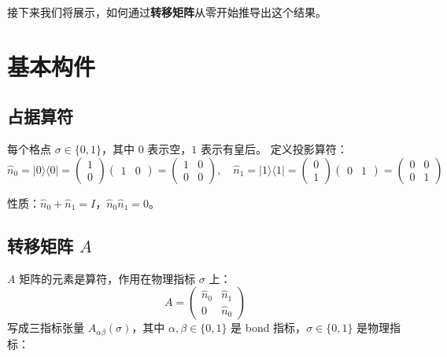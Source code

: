 \documentclass[12pt,a4paper]{article}
\begin{document}
接下来我们将展示，如何通过\textbf{转移矩阵}从零开始推导出这个结果。

\section{基本构件}

\subsection{占据算符}

每个格点 $\sigma \in \{0, 1\}$，其中 $0$ 表示空，$1$ 表示有皇后。
定义投影算符：
\[
\hat{n}_0 = |0\rangle\langle 0| = \begin{pmatrix} 1 \\ 0 \end{pmatrix}\begin{pmatrix} 1 & 0 \end{pmatrix} = \begin{pmatrix} 1 & 0 \\ 0 & 0 \end{pmatrix}, \quad
\hat{n}_1 = |1\rangle\langle 1| = \begin{pmatrix} 0 \\ 1 \end{pmatrix}\begin{pmatrix} 0 & 1 \end{pmatrix} = \begin{pmatrix} 0 & 0 \\ 0 & 1 \end{pmatrix}
\]

性质：$\hat{n}_0 + \hat{n}_1 = I$，$\hat{n}_0 \hat{n}_1 = 0$。

\subsection{转移矩阵 $A$}

\begin{keybox}[核心构件：$A$ 矩阵]
$A$ 矩阵的元素是算符，作用在物理指标 $\sigma$ 上：
\[
A = \begin{pmatrix} \hat{n}_0 & \hat{n}_1 \\ 0 & \hat{n}_0 \end{pmatrix}
\]
写成三指标张量 $A_{\alpha\beta}(\sigma)$，其中 $\alpha,\beta \in \{0,1\}$ 是 bond 指标，$\sigma \in \{0,1\}$ 是物理指标：
\end{keybox}
\end{document}
